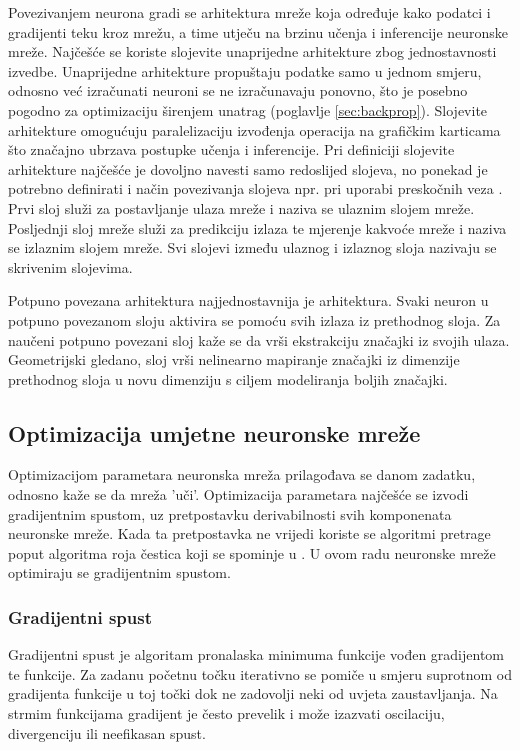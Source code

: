 \documentclass[times, utf8, numeric, diplomski]{fer}
\def\secref#1{(poglavlje \ref{#1})}
\begin{document}
Povezivanjem neurona gradi se arhitektura mreže koja određuje kako podatci i gradijenti teku kroz mrežu, a time utječu na brzinu učenja i inferencije neuronske mreže. Najčešće se koriste slojevite unaprijedne arhitekture zbog jednostavnosti izvedbe. Unaprijedne arhitekture propuštaju podatke samo u jednom smjeru, odnosno već izračunati neuroni se ne izračunavaju ponovno, što je posebno pogodno za optimizaciju širenjem unatrag \secref{sec:backprop}. Slojevite arhitekture omogućuju paralelizaciju izvođenja operacija na grafičkim karticama što značajno ubrzava postupke učenja i inferencije. Pri definiciji slojevite arhitekture najčešće je dovoljno navesti samo redoslijed slojeva, no ponekad je potrebno definirati i način povezivanja slojeva npr. pri uporabi preskočnih veza \citep{highwaynet, resnet, densenet}. Prvi sloj služi za postavljanje ulaza mreže i naziva se ulaznim slojem mreže. Posljednji sloj mreže služi za predikciju izlaza te mjerenje kakvoće mreže i naziva se izlaznim slojem mreže. Svi slojevi između ulaznog i izlaznog sloja nazivaju se skrivenim slojevima.

Potpuno povezana arhitektura najjednostavnija je arhitektura. Svaki neuron u potpuno povezanom sloju aktivira se pomoću svih izlaza iz prethodnog sloja. Za naučeni potpuno povezani sloj kaže se da vrši ekstrakciju značajki iz svojih ulaza. Geometrijski gledano, sloj vrši nelinearno mapiranje značajki iz dimenzije prethodnog sloja u novu dimenziju s ciljem modeliranja boljih značajki.

\subsection{Optimizacija umjetne neuronske mreže}
Optimizacijom parametara neuronska mreža prilagođava se danom zadatku, odnosno kaže se da mreža 'uči'. Optimizacija parametara najčešće se izvodi gradijentnim spustom, uz pretpostavku derivabilnosti svih komponenata neuronske mreže. Kada ta pretpostavka ne vrijedi koriste se algoritmi pretrage poput algoritma roja čestica koji se spominje u \citet{skripta_nenr}. U ovom radu neuronske mreže optimiraju se gradijentnim spustom.

\subsubsection{Gradijentni spust}
\label{sec:gradijentni_spust}
Gradijentni spust je algoritam pronalaska minimuma funkcije vođen gradijentom te funkcije. Za zadanu početnu točku iterativno se pomiče u smjeru suprotnom od gradijenta funkcije u toj točki dok ne zadovolji neki od uvjeta zaustavljanja. Na strmim funkcijama gradijent je često prevelik i može izazvati oscilaciju, divergenciju ili neefikasan spust.
\end{document}
